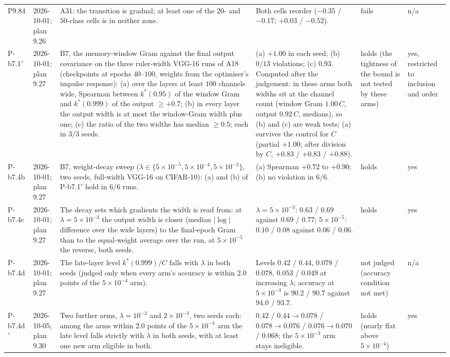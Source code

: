\begin{longtable}{p{1.1cm}p{1.4cm}p{6.2cm}p{4.6cm}p{2.0cm}p{1.6cm}}
P9.84 & 2026-10-01; plan 9.26 & A31: the transition is gradual; at least one of the $20$- and $50$-class cells is in neither zone. & Both cells reorder ($-0.35$ / $-0.17$; $+0.03$ / $-0.52$). & fails & n/a \\
P-b7.1$'$ & 2026-10-01; plan 9.27 & B7, the memory-window Gram against the final output covariance on the three ruler-width VGG-16 runs of A18 (checkpoints at epochs $40$--$100$, weights from the optimiser's impulse response): (a) over the layers at least $100$ channels wide, Spearman between $k^*(0.95)$ of the window Gram and $k^*(0.999)$ of the output $\ge +0.7$; (b) in every layer the output width is at most the window-Gram width plus one; (c) the ratio of the two widths has median $\ge 0.5$; each in $3/3$ seeds. & (a) $+1.00$ in each seed; (b) $0/13$ violations; (c) $0.93$. Computed after the judgement: in these arms both widths sit at the channel count (window Gram $1.00\,C$, output $0.92\,C$, medians), so (b) and (c) are weak tests; (a) survives the control for $C$ (partial $+1.00$; after division by $C$, $+0.83$ / $+0.83$ / $+0.88$). & holds (the tightness of the bound is not tested by these arms) & yes, restricted to inclusion and order \\
P-b7.4b & 2026-10-01; plan 9.27 & B7, weight-decay sweep ($\lambda \in \{5\!\times\!10^{-5}, 5\!\times\!10^{-4}, 5\!\times\!10^{-3}\}$, two seeds, full-width VGG-16 on CIFAR-10): (a) and (b) of P-b7.1$'$ hold in $6/6$ runs. & (a) Spearman $+0.72$ to $+0.90$; (b) no violation in $6/6$. & holds & yes \\
P-b7.4c & 2026-10-01; plan 9.27 & The decay sets which gradients the width is read from: at $\lambda = 5\!\times\!10^{-3}$ the output width is closer (median $|\log|$ difference over the wide layers) to the final-epoch Gram than to the equal-weight average over the run, at $5\!\times\!10^{-5}$ the reverse, both seeds. & $\lambda = 5\!\times\!10^{-3}$: $0.63$ / $0.69$ against $0.69$ / $0.77$; $5\!\times\!10^{-5}$: $0.10$ / $0.08$ against $0.06$ / $0.06$. & holds & yes \\
P-b7.4d & 2026-10-01; plan 9.27 & The late-layer level $k^*(0.999)/C$ falls with $\lambda$ in both seeds (judged only when every arm's accuracy is within $2.0$ points of the $5\!\times\!10^{-4}$ arm). & Levels $0.42$ / $0.44$, $0.078$ / $0.078$, $0.053$ / $0.049$ at increasing $\lambda$; accuracy at $5\!\times\!10^{-3}$ is $90.2$ / $90.7$ against $94.0$ / $93.7$. & not judged (accuracy condition not met) & n/a \\
P-b7.4d$'$ & 2026-10-05; plan 9.30 & Two further arms, $\lambda = 10^{-3}$ and $2\!\times\!10^{-3}$, two seeds each: among the arms within $2.0$ points of the $5\!\times\!10^{-4}$ arm the late level falls strictly with $\lambda$ in both seeds, with at least one new arm eligible in both. & $0.42$ / $0.44 \to 0.078$ / $0.078 \to 0.076$ / $0.076 \to 0.070$ / $0.068$; the $5\!\times\!10^{-3}$ arm stays ineligible. & holds (nearly flat above $5\!\times\!10^{-4}$) & yes \\

\end{longtable}
